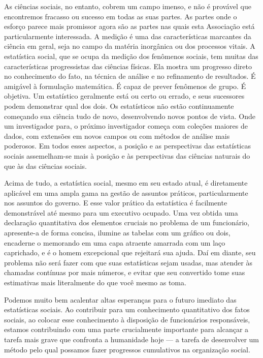 \documentclass[12pt]{article}
\begin{document}
As ciências sociais, no entanto, cobrem um campo imenso, e não é provável que encontremos fracasso ou sucesso em todas as suas partes. As partes onde o esforço parece mais promissor agora são as partes nas quais esta Associação está particularmente interessada. A medição é uma das características marcantes da ciência em geral, seja no campo da matéria inorgânica ou dos processos vitais. A estatística social, que se ocupa da medição dos fenômenos sociais, tem muitas das características progressistas das ciências físicas. Ela mostra um progresso direto no conhecimento do fato, na técnica de análise e no refinamento de resultados. É amigável à formulação matemática. É capaz de prever fenômenos de grupo. É objetiva. Um estatístico geralmente está ou certo ou errado, e seus sucessores podem demonstrar qual dos dois. Os estatísticos não estão continuamente começando sua ciência tudo de novo, desenvolvendo novos pontos de vista. Onde um investigador para, o próximo investigador começa com coleções maiores de dados, com extensões em novos campos ou com métodos de análise mais poderosos. Em todos esses aspectos, a posição e as perspectivas das estatísticas sociais assemelham-se mais à posição e às perspectivas das ciências naturais do que às das ciências sociais.

Acima de tudo, a estatística social, mesmo em seu estado atual, é diretamente aplicável em uma ampla gama na gestão de assuntos práticos, particularmente nos assuntos do governo. E esse valor prático da estatística é facilmente demonstrável até mesmo para um executivo ocupado. Uma vez obtida uma declaração quantitativa dos elementos cruciais no problema de um funcionário, apresente-a de forma concisa, ilumine as tabelas com um gráfico ou dois, encaderne o memorando em uma capa atraente amarrada com um laço caprichado, e é o homem excepcional que rejeitará sua ajuda. Daí em diante, seu problema não será fazer com que suas estatísticas sejam usadas, mas atender às chamadas contínuas por mais números, e evitar que seu convertido tome suas estimativas mais literalmente do que você mesmo as toma.

Podemos muito bem acalentar altas esperanças para o futuro imediato das estatísticas sociais. Ao contribuir para um conhecimento quantitativo dos fatos sociais, ao colocar esse conhecimento à disposição de funcionários responsáveis, estamos contribuindo com uma parte crucialmente importante para alcançar a tarefa mais grave que confronta a humanidade hoje — a tarefa de desenvolver um método pelo qual possamos fazer progressos cumulativos na organização social.
\end{document}
